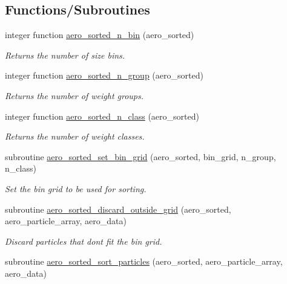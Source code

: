 \subsection*{Functions/\+Subroutines}
\begin{DoxyCompactItemize}
\item 
integer function \mbox{\hyperlink{namespacepmc__aero__sorted_ab9d526ab2c18f3b7ee01dd57cb87c733}{aero\+\_\+sorted\+\_\+n\+\_\+bin}} (aero\+\_\+sorted)
\begin{DoxyCompactList}\small\item\em Returns the number of size bins. \end{DoxyCompactList}\item 
integer function \mbox{\hyperlink{namespacepmc__aero__sorted_ac4d78c0767389592acbc13d935d8561a}{aero\+\_\+sorted\+\_\+n\+\_\+group}} (aero\+\_\+sorted)
\begin{DoxyCompactList}\small\item\em Returns the number of weight groups. \end{DoxyCompactList}\item 
integer function \mbox{\hyperlink{namespacepmc__aero__sorted_ae636353a0655df03ed70f4aa894cd11a}{aero\+\_\+sorted\+\_\+n\+\_\+class}} (aero\+\_\+sorted)
\begin{DoxyCompactList}\small\item\em Returns the number of weight classes. \end{DoxyCompactList}\item 
subroutine \mbox{\hyperlink{namespacepmc__aero__sorted_a389f4693b9a0f1323857ddff666b05c5}{aero\+\_\+sorted\+\_\+set\+\_\+bin\+\_\+grid}} (aero\+\_\+sorted, bin\+\_\+grid, n\+\_\+group, n\+\_\+class)
\begin{DoxyCompactList}\small\item\em Set the bin grid to be used for sorting. \end{DoxyCompactList}\item 
subroutine \mbox{\hyperlink{namespacepmc__aero__sorted_a86c04602bda530bf729e36acf607a0cf}{aero\+\_\+sorted\+\_\+discard\+\_\+outside\+\_\+grid}} (aero\+\_\+sorted, aero\+\_\+particle\+\_\+array, aero\+\_\+data)
\begin{DoxyCompactList}\small\item\em Discard particles that don\textquotesingle{}t fit the bin grid. \end{DoxyCompactList}\item 
subroutine \mbox{\hyperlink{namespacepmc__aero__sorted_a05ae0618baddc3764e98024c670cc248}{aero\+\_\+sorted\+\_\+sort\+\_\+particles}} (aero\+\_\+sorted, aero\+\_\+particle\+\_\+array, aero\+\_\+data)

\end{DoxyCompactItemize}
